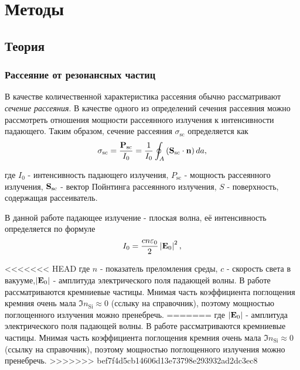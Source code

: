 \chapter{Методы}


\section{Теория}\label{sec:theory}

\subsection{Рассеяние от резонансных частиц}\label{subsec:scat_cs}

В качестве количественной характеристика рассеяния обычно рассматривают \textit{сечение рассеяния}. В качестве одного из определений сечения рассеяния можно рассмотреть отношения мощности рассеянного излучения к интенсивности падающего. Таким образом, сечение рассеяния $\sigma_{\text{sc}}$ определяется как
\begin{equation}
    \sigma_{\text{sc}} = \frac{\vb{P_{\text{sc}}}}{I_0} = \frac{1}{I_0} \oint_A  \left(  \mathbf{S}_{\text{sc}} \cdot \vb{n} \right) da,
\end{equation}

где $I_0$ - интенсивность падающего излучения, $P_{\text{sc}}$ - мощность рассеянного излучения, $\vb{S}_{\text{sc}}$ - вектор Пойнтинга рассеянного излучения, $S$ - поверхность, содержащая рассеиватель.

В данной работе падающее излучение - плоская волна, её интенсивность определяется по формуле
\begin{equation}
    I_0 = \frac{c n \varepsilon_0}{2} \left| \vb{E}_0 \right|^2,
\end{equation}

<<<<<<< HEAD
где $n$ - показатель преломления среды, $c$ - скорость света в вакууме,$\left| \vb{E}_0 \right|$ - амплитуда электрического поля падающей волны.
В работе рассматриваются кремниевые частицы. Мнимая часть коэффициента поглощения кремния очень мала $\Im{n_{\text{Si}}} \approx 0$ (сслыку на справочник), поэтому мощностью поглощенного излучения можно пренебречь. 
=======
где $\left| \vb{E}_0 \right|$ - амплитуда электрического поля падающей волны.
В работе рассматриваются кремниевые частицы. Мнимая часть коэффициента поглощения кремния очень мала $\Im{n_{\text{Si}}} \approx 0$ (ссылку на справочник), поэтому мощностью поглощенного излучения можно пренебречь. 
>>>>>>> bef7f4d5cb14606d13e73798e293932ad2dc3ec8

